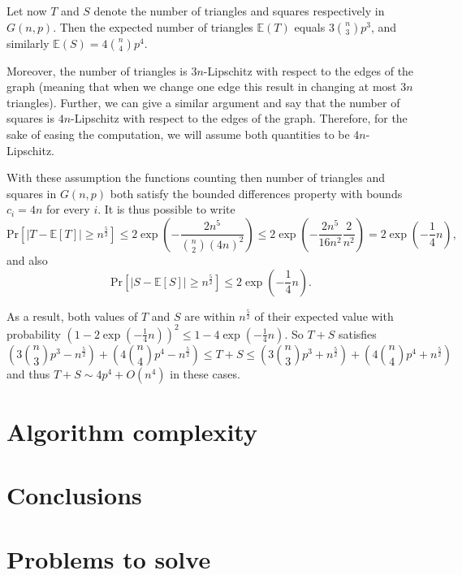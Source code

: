 \documentclass{article}
\newcommand{\E}{\mathbb{E}}
\newcommand{\Prob}{\mathrm{Pr}}
\begin{document}
	Let now $T$ and $S$ denote the number of triangles and squares respectively in $G(n,p)$.
	Then the expected number of triangles $\E(T)$ equals $3 \binom{n}{3}p^3$, and similarly $\E(S)=4 \binom{n}{4}p^4$.
	
	Moreover, the number of triangles is $3n$-Lipschitz with respect to the edges of the graph (meaning that when we change one edge this result in changing at most $3n$ triangles).
	Further, we can give a similar argument and say that the number of squares is $4n$-Lipschitz with respect to the edges of the graph.
	Therefore, for the sake of easing the computation, we will assume both quantities to be $4n$-Lipschitz.  
	
	With these assumption the functions counting then number of triangles and squares in $G(n,p)$ both satisfy the bounded differences property with bounds $c_i = 4n$ for every $i$.
	It is thus possible to write
	\[
	\Prob[\left|T - \E[T]\right|\geq n^{\frac{5}{2}}] \leq  2 \exp \left(-\frac{2n^5}{\binom{n}{2}(4n)^2} \right) \leq 2 \exp \left(-\frac{2n^5}{16 n^2} \frac{2}{n^2} \right) = 2 \exp \left(-\frac{1}{4}n \right),
	\]
	and also
	\[
	\Prob[\left|S - \E[S]\right|\geq n^{\frac{5}{2}}] \leq  2 \exp \left(-\frac{1}{4}n \right).
	\]
	
	As a result, both values of $T$ and $S$ are within $n^{\frac{5}{2}}$ of their expected value with probability $\left(1- 2\exp \left(-\frac{1}{4}n \right) \right)^2 \leq 1-4\exp\left(-\frac{1}{4}n\right)$.
	So $T+S$ satisfies 
	\[
	\left(3 \binom{n}{3}p^3 - n^{\frac{5}{2}}\right) + \left(4 \binom{n}{4}p^4 - n^{\frac{5}{2}}\right)
	\leq T+S \leq
	\left(3 \binom{n}{3}p^3 + n^{\frac{5}{2}}\right) + \left(4 \binom{n}{4}p^4 + n^{\frac{5}{2}}\right)
	\]
	and thus $T+S \sim 4p^4 + O(n^4)$ in these cases.
	
	
	\section{Algorithm complexity}
	
	\section{Conclusions}
	
	
	
	
	\section{Problems to solve}
	
\end{document}

